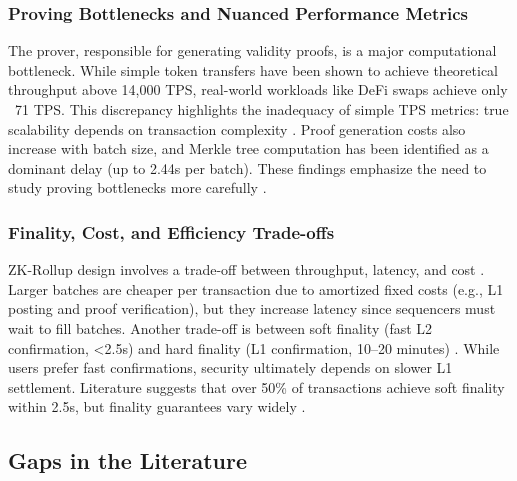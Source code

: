 \subsubsection{Proving Bottlenecks and Nuanced Performance Metrics}
\vspace{12pt}
The prover, responsible for generating validity proofs, is a major computational bottleneck. While simple token transfers have been shown to achieve theoretical throughput above 14,000 TPS, real-world workloads like DeFi swaps achieve only ~71 TPS. This discrepancy highlights the inadequacy of simple TPS metrics: true scalability depends on transaction complexity \cite{gogol2025scalingdefi}. Proof generation costs also increase with batch size, and Merkle tree computation has been identified as a dominant delay (up to 2.44s per batch). These findings emphasize the need to study proving bottlenecks more carefully \cite{gogol2025scalingdefi}.

\subsubsection{Finality, Cost, and Efficiency Trade-offs}
\vspace{12pt}
ZK-Rollup design involves a trade-off between throughput, latency, and cost \cite{motepalli2023sok}. Larger batches are cheaper per transaction due to amortized fixed costs (e.g., L1 posting and proof verification), but they increase latency since sequencers must wait to fill batches. Another trade-off is between soft finality (fast L2 confirmation, \textless 2.5s) and hard finality (L1 confirmation, 10–20 minutes) \cite{gogol2025scalingdefi}. While users prefer fast confirmations, security ultimately depends on slower L1 settlement. Literature suggests that over 50\% of transactions achieve soft finality within 2.5s, but finality guarantees vary widely \cite{gogol2025scalingdefi}.

\subsection{Gaps in the Literature}
\vspace{12pt}

